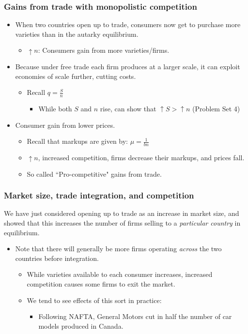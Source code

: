 \documentclass{beamer}
\begin{document}
\begin{frame}
	\frametitle{Gains from trade with monopolistic competition}
	\begin{itemize}
		\item When two countries open up to trade, consumers now get to purchase more varieties than in the autarky equilibrium.
		\begin{itemize}
			\item $\uparrow n$: Consumers gain from more varieties/firms.
		\end{itemize}
		\item Because under free trade each firm produces at a larger scale, it can exploit economies of scale further, cutting costs.
		\begin{itemize}
			\item Recall $q=\frac{S}{n}$
			\begin{itemize}
				\item While both $S$ and $n$ rise, can show that $\uparrow S > \uparrow n$ (Problem Set 4)
			\end{itemize}
		\end{itemize}
		
		\item Consumer gain from lower prices.
		\begin{itemize}
			\item Recall that markups are given by: $\mu=\frac{1}{bn}$
			\item $\uparrow n$, increased competition, firms decrease their markups, and prices fall.
			\item So called ``Pro-competitive" gains from trade. 
		\end{itemize}
	\end{itemize}
	
\end{frame}

\begin{frame}
	\frametitle{Market size, trade integration, and competition}
	We have just considered opening up to trade as an increase in market size, and showed that this increases the number of firms selling to a \emph{particular country} in equilibrium.
	\begin{itemize}
		\item Note that there will generally be more firms operating \emph{across} the two countries before integration.
		\begin{itemize}
			\item While varieties available to each consumer increases, increased competition causes some firms to exit the market.
			\item We tend to see effects of this sort in practice:
			\begin{itemize}
				\item Following NAFTA, General Motors cut in half the number of car models produced in Canada. 
			\end{itemize}
		\end{itemize}
	\end{itemize}
\end{frame}
\end{document}
